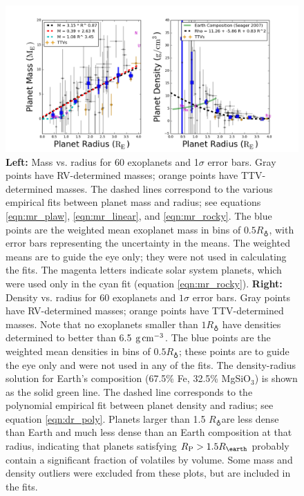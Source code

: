 \documentclass[iop]{emulateapj}
\newcommand{\gcmc}{\ensuremath{\rm g\,cm^{-3}}}
\newcommand{\gcc}{\gcmc}
\newcommand{\rpl}{\ensuremath{R_{\rm P}}}
\newcommand{\rearth}{\ensuremath{R_\earth}}
\begin{document}
\begin{figure}[htbp] %
   \centering
    \includegraphics[width=6in]{mr_small.png} 
   \caption{\small \textbf{Left:} Mass vs. radius for 60 exoplanets and 1$\sigma$ error bars.  Gray points  have RV-determined masses; orange points have TTV-determined masses.  The dashed lines correspond to the various empirical fits between planet mass and radius; see equations \ref{eqn:mr_plaw}, \ref{eqn:mr_linear}, and \ref{eqn:mr_rocky}.  The blue points are the weighted mean exoplanet mass in bins of $0.5 \rearth$, with error bars representing the uncertainty in the means.  The weighted means are to guide the eye only; they were not used in calculating the fits.  The magenta letters indicate solar system planets, which were used only in the cyan fit (equation \ref{eqn:mr_rocky}).  \textbf{Right:} Density vs. radius for 60 exoplanets and $1\sigma$ error bars.  Gray points  have RV-determined masses; orange points have TTV-determined masses.  Note that no exoplanets smaller than $1\rearth$ have densities determined to better than 6.5 \gcc.  The blue points are the weighted mean densities in bins of $0.5 \rearth$; these points are to guide the eye only and were not used in any of the fits.  The \citet{Seager2007} density-radius solution for Earth's composition (67.5\% Fe, 32.5\% MgSiO$_3$) is shown as the solid green line.  The dashed line corresponds to the polynomial empirical fit between planet density and radius; see equation \ref{eqn:dr_poly}.  Planets larger than 1.5 \rearth are less dense than Earth and much less dense than an Earth composition at that radius, indicating that planets satisfying $\rpl > 1.5 \rearth$ probably contain a significant fraction of volatiles by volume.  Some mass and density outliers were excluded from these plots, but are included in the fits.}
   \label{fig:rm_4}
\end{figure}
\end{document}
